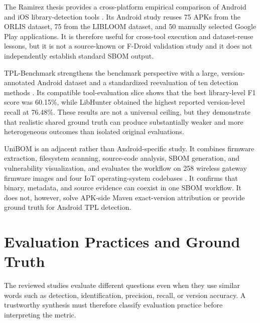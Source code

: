 The Ramirez thesis provides a cross-platform empirical comparison of Android
and iOS library-detection tools \cite{ramirez2024empirical}. Its Android study
reuses 75 APKs from the ORLIS dataset, 75 from the LIBLOOM dataset, and 50
manually selected Google Play applications. It is therefore useful for
cross-tool execution and dataset-reuse lessons, but it is not a source-known
or F-Droid validation study and it does not independently establish standard
SBOM output.

TPL-Benchmark strengthens the benchmark perspective with a large,
version-annotated Android dataset and a standardized reevaluation of ten
detection methods \cite{gu2025tplbenchmark}. Its compatible tool-evaluation
slice shows that the best library-level F1 score was 60.15\%, while LibHunter
obtained the highest reported version-level recall at 76.48\%. These results
are not a universal ceiling, but they demonstrate that realistic shared
ground truth can produce substantially weaker and more heterogeneous outcomes
than isolated original evaluations.

UniBOM is an adjacent rather than Android-specific study. It combines firmware
extraction, filesystem scanning, source-code analysis, SBOM generation, and
vulnerability visualization, and evaluates the workflow on 258 wireless
gateway firmware images and four IoT operating-system codebases
\cite{safronov2025unibom}. It confirms that binary, metadata, and source
evidence can coexist in one SBOM workflow. It does not, however, solve
APK-side Maven exact-version attribution or provide ground truth for Android
TPL detection.

\section{Evaluation Practices and Ground Truth}

The reviewed studies evaluate different questions even when they use similar
words such as detection, identification, precision, recall, or version
accuracy. A trustworthy synthesis must therefore classify evaluation practice
before interpreting the metric.

